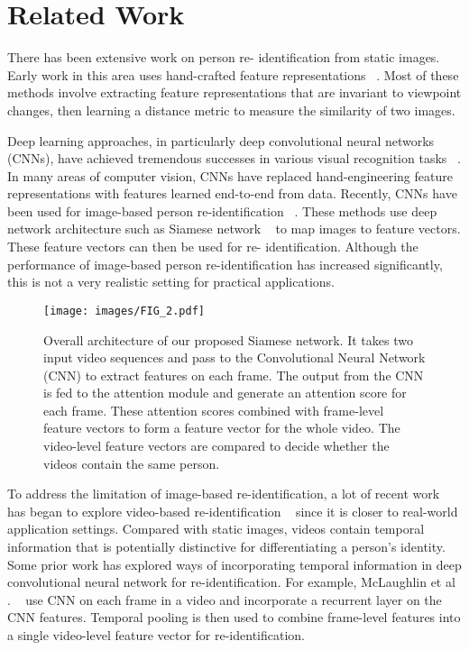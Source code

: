 \documentclass[sigconf, authordraft,review=false]{acmart}
\begin{document}
\section{Related Work}
There    has    been    extensive    work    on    person    re- identification from static images.   Early work in this area uses hand-crafted feature representations ~\cite{gray08_eccv,liao15_cvpr,ma12_workshop,matsukawa16_cvpr,zhao14_cvpr}. Most  of  these  methods  involve  extracting  feature  representations  that  are  invariant  to  viewpoint  changes,  then
learning a distance metric to measure the similarity of two images.

Deep  learning  approaches,  in  particularly  deep  convolutional  neural  networks  (CNNs),  have  achieved  tremendous successes in various visual recognition tasks ~\cite{krizhevsky12_nips}.  In many areas of computer vision, CNNs have replaced hand-engineering  feature  representations  with  features  learned end-to-end from data.  Recently, CNNs have been used for image-based  person  re-identification ~\cite{liao15_iccv,qian17_iccv,ustinova17_avss,varior16_eccv,xiao16_cvpr,yi14_icpr,
zhangL16_cvpr,zhengL15_iccv}.   These  methods  use  deep  network  architecture  such  as  Siamese  network  ~\cite{hadsell06_cvpr}  to  map  images  to  feature vectors.  These feature vectors can then be used for re- identification.   Although  the  performance  of  image-based person  re-identification  has  increased  significantly,  this  is not a very realistic setting for practical applications.
\begin{figure*}
\texttt{[image: images/FIG\_2.pdf]}
\caption{Overall architecture of our proposed Siamese network. It takes two input video sequences and pass to the Convolutional Neural
Network (CNN) to extract features on each frame. The output from the CNN is fed to the attention module and generate an attention score
for each frame.  These attention scores combined with frame-level feature vectors to form a feature vector for the
whole video. The video-level feature vectors are compared to decide whether the videos contain the same person.}
\end{figure*}
To address the limitation of image-based re-identification,  a  lot  of  recent  work  has  began  to  explore
video-based re-identification ~\cite{li17_workshop,liu15_iccv,mclaughlin16_cvpr,
wang14_eccv,xu17_iccv,yan16_eccv,zhou17_cvpr,zhu16_ijcai} since   it   is   closer   to   real-world   application   settings. Compared  with  static  images,   videos  contain  temporal information  that  is  potentially  distinctive  for  differentiating  a  person\textup{'}s  identity.   Some  prior  work  has  explored
ways   of   incorporating   temporal   information   in   deep convolutional  neural  network  for  re-identification. For example, McLaughlin et al . ~\cite{mclaughlin16_cvpr} use CNN on each frame in  a  video  and  incorporate  a  recurrent  layer  on  the  CNN features. Temporal  pooling  is  then  used  to  combine frame-level features into a single video-level feature vector for re-identification.
\end{document}
